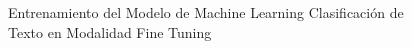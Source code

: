 \documentclass[onecolumn, journal, english, 12pt, a4paper]{IEEEtran} %
\theoremstyle{definition}
\begin{document}
\begin{figure}[!t]
\centering
{}
\hfil
{}
\caption{Entrenamiento del Modelo de Machine Learning Clasificación de Texto en Modalidad Fine Tuning}
\label{fig: results}
\end{figure}
\end{document}
